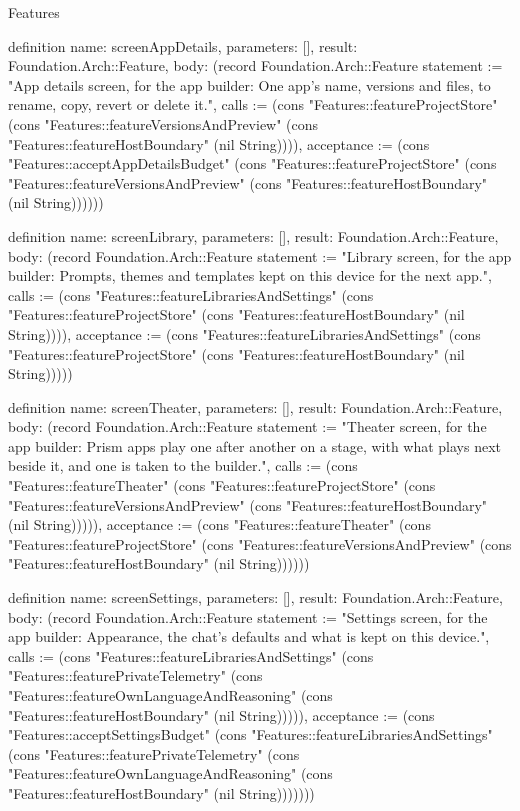 \begin{lexlean}{Features}
\begin{semanticmodule}
definition{
  name: screenAppDetails,
  parameters: [],
  result: Foundation.Arch::Feature,
  body: (record Foundation.Arch::Feature {statement := "App details screen, for the app builder: One app's name, versions and files, to rename, copy, revert or delete it.", calls := (cons "Features::featureProjectStore" (cons "Features::featureVersionsAndPreview" (cons "Features::featureHostBoundary" (nil String)))), acceptance := (cons "Features::acceptAppDetailsBudget" (cons "Features::featureProjectStore" (cons "Features::featureVersionsAndPreview" (cons "Features::featureHostBoundary" (nil String)))))})
}

definition{
  name: screenLibrary,
  parameters: [],
  result: Foundation.Arch::Feature,
  body: (record Foundation.Arch::Feature {statement := "Library screen, for the app builder: Prompts, themes and templates kept on this device for the next app.", calls := (cons "Features::featureLibrariesAndSettings" (cons "Features::featureProjectStore" (cons "Features::featureHostBoundary" (nil String)))), acceptance := (cons "Features::featureLibrariesAndSettings" (cons "Features::featureProjectStore" (cons "Features::featureHostBoundary" (nil String))))})
}

definition{
  name: screenTheater,
  parameters: [],
  result: Foundation.Arch::Feature,
  body: (record Foundation.Arch::Feature {statement := "Theater screen, for the app builder: Prism apps play one after another on a stage, with what plays next beside it, and one is taken to the builder.", calls := (cons "Features::featureTheater" (cons "Features::featureProjectStore" (cons "Features::featureVersionsAndPreview" (cons "Features::featureHostBoundary" (nil String))))), acceptance := (cons "Features::featureTheater" (cons "Features::featureProjectStore" (cons "Features::featureVersionsAndPreview" (cons "Features::featureHostBoundary" (nil String)))))})
}

definition{
  name: screenSettings,
  parameters: [],
  result: Foundation.Arch::Feature,
  body: (record Foundation.Arch::Feature {statement := "Settings screen, for the app builder: Appearance, the chat's defaults and what is kept on this device.", calls := (cons "Features::featureLibrariesAndSettings" (cons "Features::featurePrivateTelemetry" (cons "Features::featureOwnLanguageAndReasoning" (cons "Features::featureHostBoundary" (nil String))))), acceptance := (cons "Features::acceptSettingsBudget" (cons "Features::featureLibrariesAndSettings" (cons "Features::featurePrivateTelemetry" (cons "Features::featureOwnLanguageAndReasoning" (cons "Features::featureHostBoundary" (nil String))))))})
}


\end{semanticmodule}
\end{lexlean}
